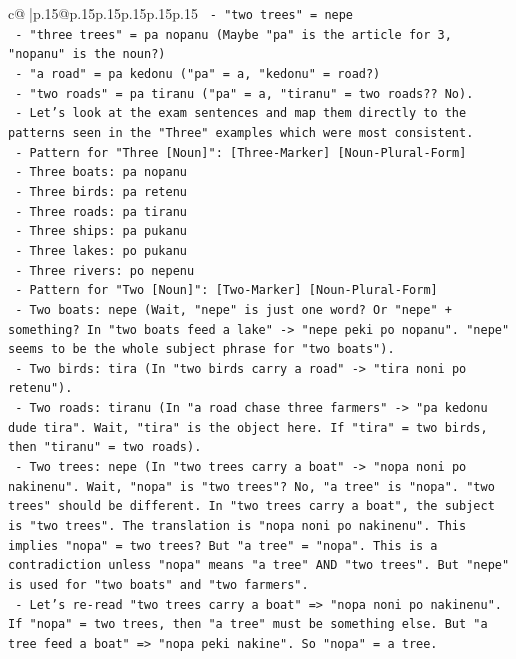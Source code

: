 \documentclass{article}
\begin{document}
{\begin{supertabular}{c@{$\;$}|p{.15\linewidth}@{}p{.15\linewidth}p{.15\linewidth}p{.15\linewidth}p{.15\linewidth}p{.15\linewidth}}
{{{\texttt{    {-} "two trees" = nepe} \\
\texttt{    {-} "three trees" = pa nopanu (Maybe "pa" is the article for 3, "nopanu" is the noun?)} \\
\texttt{    {-} "a road" = pa kedonu ("pa" = a, "kedonu" = road?)} \\
\texttt{    {-} "two roads" = pa tiranu ("pa" = a, "tiranu" = two roads?? No).} \\
\texttt{    {-} Let's look at the exam sentences and map them directly to the patterns seen in the "Three" examples which were most consistent.} \\
\texttt{    {-} Pattern for "Three {[}Noun{]}": {[}Three{-}Marker{]} {[}Noun{-}Plural{-}Form{]}} \\
\texttt{      {-} Three boats: pa nopanu} \\
\texttt{      {-} Three birds: pa retenu} \\
\texttt{      {-} Three roads: pa tiranu} \\
\texttt{      {-} Three ships: pa pukanu} \\
\texttt{      {-} Three lakes: po pukanu} \\
\texttt{      {-} Three rivers: po nepenu} \\
\texttt{    {-} Pattern for "Two {[}Noun{]}": {[}Two{-}Marker{]} {[}Noun{-}Plural{-}Form{]}} \\
\texttt{      {-} Two boats: nepe (Wait, "nepe" is just one word? Or "nepe" + something? In "two boats feed a lake" {-}> "nepe peki po nopanu". "nepe" seems to be the whole subject phrase for "two boats").} \\
\texttt{      {-} Two birds: tira (In "two birds carry a road" {-}> "tira noni po retenu").} \\
\texttt{      {-} Two roads: tiranu (In "a road chase three farmers" {-}> "pa kedonu dude tira". Wait, "tira" is the object here. If "tira" = two birds, then "tiranu" = two roads).} \\
\texttt{      {-} Two trees: nepe (In "two trees carry a boat" {-}> "nopa noni po nakinenu". Wait, "nopa" is "two trees"? No, "a tree" is "nopa". "two trees" should be different. In "two trees carry a boat", the subject is "two trees". The translation is "nopa noni po nakinenu". This implies "nopa" = two trees? But "a tree" = "nopa". This is a contradiction unless "nopa" means "a tree" AND "two trees". But "nepe" is used for "two boats" and "two farmers".} \\
\texttt{      {-} Let's re{-}read "two trees carry a boat" => "nopa noni po nakinenu". If "nopa" = two trees, then "a tree" must be something else. But "a tree feed a boat" => "nopa peki nakine". So "nopa" = a tree.} \\
}}}
\end{supertabular}}
\end{document}

